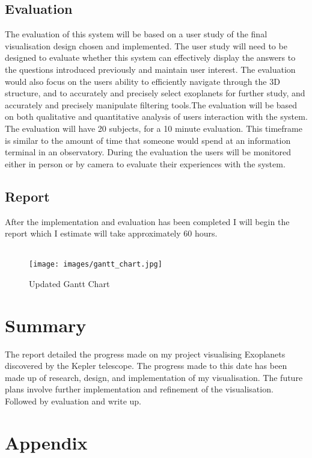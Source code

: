 \documentclass[11pt
              , a4paper
              , twoside
              , openright
              ]{report}
\begin{document}
\section{Evaluation}
The evaluation of this system will be based on a user study of the final
visualisation design
chosen and implemented. The user study will need to be designed to evaluate
whether this
system can effectively display the answers to the questions introduced
previously and maintain
user interest. The evaluation would also focus on the users ability to
efficiently navigate
through the 3D structure, and to accurately and precisely select exoplanets for
further study,
and accurately and precisely manipulate filtering tools.The evaluation will be
based on both
qualitative and quantitative analysis of users interaction with the system.
The evaluation will have 20 subjects, for a 10 minute evaluation. This timeframe
is similar to
the amount of time that someone would spend at an information terminal in an
observatory.
During the evaluation the users will be monitored either in person or by camera
to evaluate
their experiences with the system.
\section{Report}
After the implementation and evaluation has been completed I will begin the
report which I estimate will take approximately 60 hours.
\\\\
\begin{figure}[h!]
  \centering
      \texttt{[image: images/gantt\_chart.jpg]}
  \caption{Updated Gantt Chart}
\end{figure}
\chapter{Summary}
The report detailed the progress made on my project visualising Exoplanets
discovered by the Kepler telescope. The progress made to this date has been made
up of research, design, and implementation of my visualisation. The future plans
involve further implementation and refinement of the visualisation. Followed by
evaluation and write up.
\backmatter


%
\nocite{*}


\chapter{Appendix}
\end{document}
